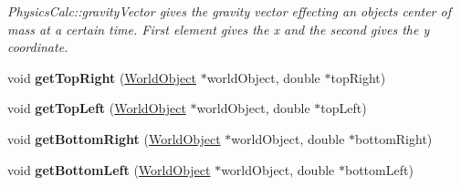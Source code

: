 \begin{DoxyCompactItemize}
\begin{DoxyCompactList}\small\item\em Physics\+Calc\+::gravity\+Vector gives the gravity vector effecting an objects center of mass at a certain time. First element gives the x and the second gives the y coordinate. \end{DoxyCompactList}\item 
void {\bfseries get\+Top\+Right} (\hyperlink{class_world_object}{World\+Object} $\ast$world\+Object, double $\ast$top\+Right)\hypertarget{class_physics_calc_af23c90f3041fe0b8be343ef2a35245d2}{}\label{class_physics_calc_af23c90f3041fe0b8be343ef2a35245d2}

\item 
void {\bfseries get\+Top\+Left} (\hyperlink{class_world_object}{World\+Object} $\ast$world\+Object, double $\ast$top\+Left)\hypertarget{class_physics_calc_a518d1c85e39c54bd349e02659c92b134}{}\label{class_physics_calc_a518d1c85e39c54bd349e02659c92b134}

\item 
void {\bfseries get\+Bottom\+Right} (\hyperlink{class_world_object}{World\+Object} $\ast$world\+Object, double $\ast$bottom\+Right)\hypertarget{class_physics_calc_af118ca721ecccebab2c88e53b7471320}{}\label{class_physics_calc_af118ca721ecccebab2c88e53b7471320}

\item 
void {\bfseries get\+Bottom\+Left} (\hyperlink{class_world_object}{World\+Object} $\ast$world\+Object, double $\ast$bottom\+Left)\hypertarget{class_physics_calc_a9a74039e739a8649547c6d2f8aaf7fab}{}\label{class_physics_calc_a9a74039e739a8649547c6d2f8aaf7fab}


\end{DoxyCompactItemize}
